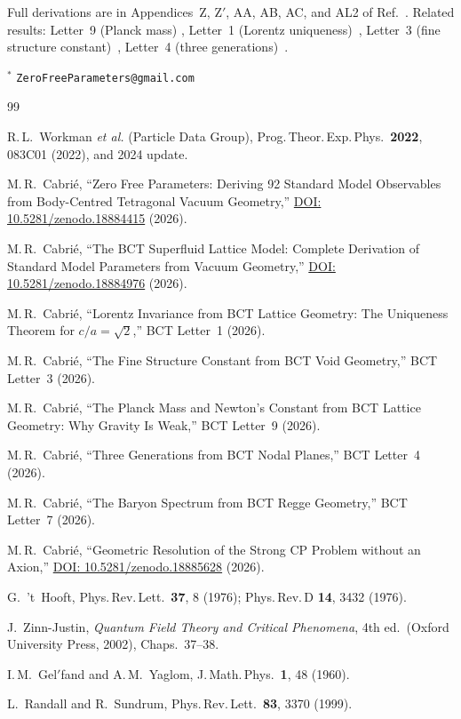 \documentclass[twocolumn,10pt,a4paper]{article}
\begin{document}
Full derivations are in Appendices~Z, Z$'$, AA, AB, AC, and AL2 of
Ref.~\cite{monograph}.  Related results: Letter~9 (Planck mass)
\cite{planck}, Letter~1 (Lorentz uniqueness)~\cite{lorentz}, Letter~3
(fine structure constant)~\cite{finestructure}, Letter~4 (three
generations)~\cite{generations}.

\vspace{4pt}
\noindent$^\ast$ \texttt{ZeroFreeParameters@gmail.com}

\begin{thebibliography}{99}

R.\,L.~Workman \textit{et al.} (Particle Data Group),
Prog.\,Theor.\,Exp.\,Phys.\ \textbf{2022}, 083C01 (2022), and 2024 update.

M.\,R.~Cabri\'{e}, ``Zero Free Parameters: Deriving 92 Standard Model
Observables from Body-Centred Tetragonal Vacuum Geometry,''
\href{https://doi.org/10.5281/zenodo.18884415}{DOI: 10.5281/zenodo.18884415}
(2026).

M.\,R.~Cabri\'{e}, ``The BCT Superfluid Lattice Model: Complete Derivation
of Standard Model Parameters from Vacuum Geometry,''
\href{https://doi.org/10.5281/zenodo.18884976}{DOI: 10.5281/zenodo.18884976}
(2026).

M.\,R.~Cabri\'{e}, ``Lorentz Invariance from BCT Lattice Geometry: The
Uniqueness Theorem for $c/a=\sqrt{2}$,'' BCT Letter~1 (2026).

M.\,R.~Cabri\'{e}, ``The Fine Structure Constant from BCT Void Geometry,''
BCT Letter~3 (2026).

M.\,R.~Cabri\'{e}, ``The Planck Mass and Newton's Constant from BCT
Lattice Geometry: Why Gravity Is Weak,'' BCT Letter~9 (2026).

M.\,R.~Cabri\'{e}, ``Three Generations from BCT Nodal Planes,''
BCT Letter~4 (2026).

M.\,R.~Cabri\'{e}, ``The Baryon Spectrum from BCT Regge Geometry,''
BCT Letter~7 (2026).

M.\,R.~Cabri\'{e}, ``Geometric Resolution of the Strong CP Problem without
an Axion,''
\href{https://doi.org/10.5281/zenodo.18885628}{DOI: 10.5281/zenodo.18885628}
(2026).

G.~'t~Hooft, Phys.\,Rev.\,Lett.\ \textbf{37}, 8 (1976);
Phys.\,Rev.\,D \textbf{14}, 3432 (1976).

J.~Zinn-Justin, \textit{Quantum Field Theory and Critical Phenomena},
4th ed.\ (Oxford University Press, 2002), Chaps.~37--38.

I.\,M.~Gel$'$fand and A.\,M.~Yaglom,
J.\,Math.\,Phys.\ \textbf{1}, 48 (1960).

L.~Randall and R.~Sundrum,
Phys.\,Rev.\,Lett.\ \textbf{83}, 3370 (1999).

\end{thebibliography}
\end{document}
